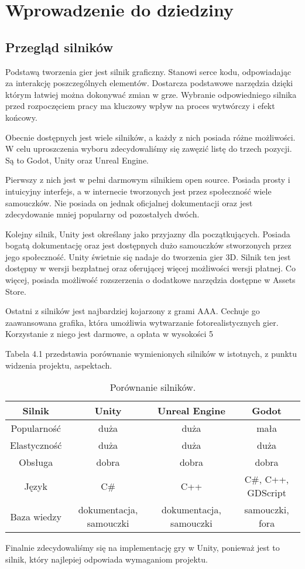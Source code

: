 \chapter{Wprowadzenie do dziedziny}\label{chap:field}

\section{Przegląd silników}
Podstawą tworzenia gier jest silnik graficzny. Stanowi serce kodu, odpowiadając za interakcję poszczególnych elementów. Dostarcza podstawowe narzędzia dzięki którym łatwiej można dokonywać zmian w grze. Wybranie odpowiedniego silnika przed rozpoczęciem pracy ma kluczowy wpływ na proces wytwórczy i efekt końcowy.

Obecnie dostępnych jest wiele silników, a każdy z nich posiada różne możliwości. W celu uproszczenia wyboru zdecydowaliśmy się zawęzić listę do trzech pozycji. Są to Godot, Unity oraz Unreal Engine.

Pierwszy z nich jest w pełni darmowym silnikiem open source. Posiada prosty i intuicyjny interfejs, a w internecie tworzonych jest przez społeczność wiele samouczków. Nie posiada on jednak oficjalnej dokumentacji oraz jest zdecydowanie mniej popularny od pozostałych dwóch.

Kolejny silnik, Unity jest określany jako przyjazny dla początkujących. Posiada bogatą dokumentację oraz jest dostępnych dużo samouczków stworzonych przez jego społeczność. Unity świetnie się nadaje do tworzenia gier 3D. Silnik ten jest dostępny w wersji bezpłatnej oraz oferującej więcej możliwości wersji płatnej. Co więcej, posiada możliwość rozszerzenia o dodatkowe narzędzia dostępne w Assets Store.

Ostatni z silników jest najbardziej kojarzony z grami AAA. Cechuje go zaawansowana grafika, która umożliwia wytwarzanie fotorealistycznych gier. Korzystanie z niego jest darmowe, a opłata w wysokości 5%

Tabela 4.1 przedstawia porównanie wymienionych silników w istotnych, z punktu widzenia projektu, aspektach.

\begin{table}[h]
\begin{center}
\begin{tabular}{ |c||c|c|c| }
 \hline
 Silnik & Unity & Unreal Engine & Godot \\
 \hline \hline
 Popularność & duża & duża & mała \\
 \hline
 Elastyczność & duża & duża & duża \\
 \hline
 Obsługa & dobra & dobra & dobra \\
 \hline
 Język & C\# & C++ & C\#, C++, GDScript \\
 \hline
 Baza wiedzy & dokumentacja,  samouczki & dokumentacja, samouczki & samouczki, fora \\
 \hline
\end{tabular}
\end{center}
\caption{Porównanie silników.}
\end{table}

Finalnie zdecydowaliśmy się na implementację gry w Unity, ponieważ jest to silnik, który najlepiej odpowiada wymaganiom projektu.